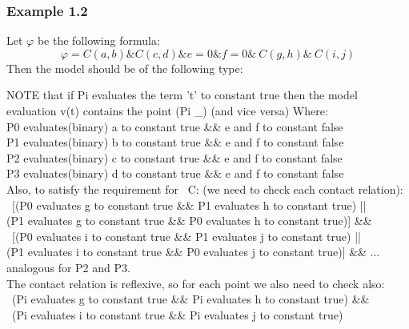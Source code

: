 \documentclass{article}
\begin{document}
			\subsubsection*{Example 1.2}
				Let $\varphi$ be the following formula:
				\begin{equation*}
					\varphi = C(a,b) \& C(c,d) \& e=0 \& f=0 \& ~C(g,h) \& ~C(i, j)
				\end{equation*}
				Then the model should be of the following type:
				\newline
				\newline
				NOTE that if Pi evaluates the term 't' to constant true then the model 
				evaluation v(t) contains the point (Pi \_) (and vice versa)
				\newline
				Where: \\
				P0 evaluates(binary) a to constant true \&\& e and f to constant false \\
			      P1 evaluates(binary) b to constant true \&\& e and f to constant false \\ 
				P2 evaluates(binary) c to constant true \&\& e and f to constant false \\ 
			      P3 evaluates(binary) d to constant true \&\& e and f to constant false \\ 
				Also, to satisfy the requirement for ~C: (we need to check each contact relation): \\
				~[(P0 evaluates g to constant true \&\& P1 evaluates h to constant true) || \\
				(P1 evaluates g to constant true \&\& P0 evaluates h to constant true)] \&\& \\
				~[(P0 evaluates i to constant true \&\& P1 evaluates j to constant true) || \\
				(P1 evaluates i to constant true \&\& P0 evaluates j to constant true)] \&\& ... analogous for P2 and P3. \\
				\newline
				The contact relation is reflexive, so for each point we also need to check also:	\\
				~(Pi evaluates g to constant true \&\& Pi evaluates h to constant true) \&\& \\
				~(Pi evaluates i to constant true \&\& Pi evaluates j to constant true)
\end{document}
